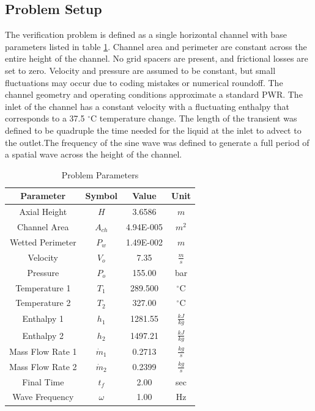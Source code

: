\documentclass{mc2015}
\begin{document}
\subsection{Problem Setup}


The verification problem is defined as a single horizontal channel with
base parameters listed in table \ref{table:parameters}. Channel area and
perimeter are constant across the entire height of the channel. No grid spacers
are present, and frictional losses are set to zero. Velocity and pressure
are assumed to be constant, but small fluctuations may occur due to coding
mistakes or numerical roundoff. The channel geometry and
operating conditions approximate a standard PWR. The inlet of the channel has a
constant velocity with a fluctuating enthalpy that corresponds to a 37.5
$^\circ$C temperature change.  The length of the transient was defined to be
quadruple the time needed for the liquid at the inlet to advect to the
outlet.The frequency of the sine wave was defined to generate a full period of a
spatial wave across the height of the channel.

\begin{table}[h]
\center
\caption{Problem Parameters}
\label{table:parameters}
\begin{tabular}{|c|c|c|c|}
\hline
Parameter	&	Symbol	&	Value	&	Unit	\\ \hline
Axial Height	&	$H$	&	3.6586	&	$m$	\\ \hline
Channel Area	&	$A_{ch}$	&	4.94E-005	&	$m^{2}$	\\ \hline
Wetted Perimeter	&	$P_{w}$	&	1.49E-002	&	$m$	\\ \hline
Velocity	&	$V_{o}$	&	7.35	&	$\frac{m}{s}$	\\ \hline
Pressure	&	$P_{o}$	&	155.00	&	bar	\\ \hline
Temperature 1	&	$T_{1}$	&	289.500	&	$^{\circ}$C	\\ \hline
Temperature 2	&	$T_{2}$	&	327.00	&	$^{\circ}$C	\\ \hline
Enthalpy 1	&	$h_{1}$	&	1281.55	&	$\frac{kJ}{kg}$	\\ \hline
Enthalpy 2	&	$h_{2}$	&	1497.21	&	$\frac{kJ}{kg}$	\\ \hline
Mass Flow Rate 1	&	$\dot{m}_{1}$	&	0.2713	&	$\frac{kg}{s}$	\\ \hline
Mass Flow Rate 2	&	$\dot{m}_{2}$	&	0.2399	&	$\frac{kg}{s}$	\\ \hline
Final Time	&	$t_{f}$	&	2.00	&	sec	\\ \hline
Wave Frequency	&	$\omega$	&	1.00	&	Hz	\\ \hline
\end{tabular}
\end{table}
\end{document}

